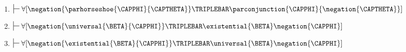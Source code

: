\begin{multicols}{2}
\begin{enumerate}
 
\item $\sststile{}{}\forall[\negation{\parhorseshoe{\CAPPHI}{\CAPTHETA}}\TRIPLEBAR\parconjunction{\CAPPHI}{\negation{\CAPTHETA}}]$


\item $\sststile{}{}\forall[\negation{\universal{\BETA}{\CAPPHI}}\TRIPLEBAR\existential{\BETA}\negation{{\CAPPHI}}]$

\item $\sststile{}{}\forall[\negation{\existential{\BETA}{\CAPPHI}}\TRIPLEBAR\universal{\BETA}\negation{{\CAPPHI}}]$

\end{enumerate}
\end{multicols}

